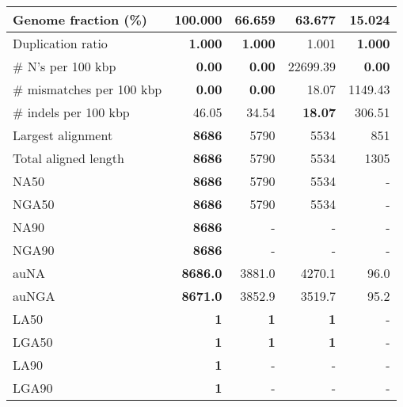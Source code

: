 \documentclass[12pt,a4paper]{article}
\begin{document}
\begin{table}[ht]
\begin{center}
\begin{tabular}{|l*{4}{|r}|}
Genome fraction (\%) & {\bf 100.000} & 66.659 & 63.677 & 15.024 \\ \hline
Duplication ratio & {\bf 1.000} & {\bf 1.000} & 1.001 & {\bf 1.000} \\ \hline
\# N's per 100 kbp & {\bf 0.00} & {\bf 0.00} & 22699.39 & {\bf 0.00} \\ \hline
\# mismatches per 100 kbp & {\bf 0.00} & {\bf 0.00} & 18.07 & 1149.43 \\ \hline
\# indels per 100 kbp & 46.05 & 34.54 & {\bf 18.07} & 306.51 \\ \hline
Largest alignment & {\bf 8686} & 5790 & 5534 & 851 \\ \hline
Total aligned length & {\bf 8686} & 5790 & 5534 & 1305 \\ \hline
NA50 & {\bf 8686} & 5790 & 5534 & - \\ \hline
NGA50 & {\bf 8686} & 5790 & 5534 & - \\ \hline
NA90 & {\bf 8686} & - & - & - \\ \hline
NGA90 & {\bf 8686} & - & - & - \\ \hline
auNA & {\bf 8686.0} & 3881.0 & 4270.1 & 96.0 \\ \hline
auNGA & {\bf 8671.0} & 3852.9 & 3519.7 & 95.2 \\ \hline
LA50 & {\bf 1} & {\bf 1} & {\bf 1} & - \\ \hline
LGA50 & {\bf 1} & {\bf 1} & {\bf 1} & - \\ \hline
LA90 & {\bf 1} & - & - & - \\ \hline
LGA90 & {\bf 1} & - & - & - \\ \hline
\end{tabular}
\end{center}
\end{table}
\end{document}

